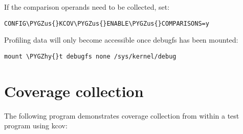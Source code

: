 \documentclass[a4paper,8pt,english]{sphinxmanual}
\def\PYGZus{\char`\_}
\def\PYGZhy{\char`\-}
\begin{document}
If the comparison operands need to be collected, set:

\begin{Verbatim}[commandchars=\\\{\}]
CONFIG\PYGZus{}KCOV\PYGZus{}ENABLE\PYGZus{}COMPARISONS=y
\end{Verbatim}

Profiling data will only become accessible once debugfs has been mounted:

\begin{Verbatim}[commandchars=\\\{\}]
mount \PYGZhy{}t debugfs none /sys/kernel/debug
\end{Verbatim}


\section{Coverage collection}
\label{dev-tools/kcov:coverage-collection}
The following program demonstrates coverage collection from within a test
program using kcov:
\end{document}
